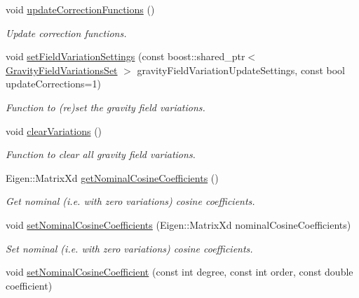 \begin{DoxyCompactItemize}
void \hyperlink{classtudat_1_1gravitation_1_1TimeDependentSphericalHarmonicsGravityField_a869a32a27923e1d7c693f609b957bd81}{update\+Correction\+Functions} ()
\begin{DoxyCompactList}\small\item\em Update correction functions. \end{DoxyCompactList}\item 
void \hyperlink{classtudat_1_1gravitation_1_1TimeDependentSphericalHarmonicsGravityField_a14b0facf17bdbc355512711ddb4cde57}{set\+Field\+Variation\+Settings} (const boost\+::shared\+\_\+ptr$<$ \hyperlink{classtudat_1_1gravitation_1_1GravityFieldVariationsSet}{Gravity\+Field\+Variations\+Set} $>$ gravity\+Field\+Variation\+Update\+Settings, const bool update\+Corrections=1)
\begin{DoxyCompactList}\small\item\em Function to (re)set the gravity field variations. \end{DoxyCompactList}\item 
void \hyperlink{classtudat_1_1gravitation_1_1TimeDependentSphericalHarmonicsGravityField_a26ff5e9340b27570340695b24b4501e6}{clear\+Variations} ()
\begin{DoxyCompactList}\small\item\em Function to clear all gravity field variations. \end{DoxyCompactList}\item 
Eigen\+::\+Matrix\+Xd \hyperlink{classtudat_1_1gravitation_1_1TimeDependentSphericalHarmonicsGravityField_a8ce8c65214e7e50a7221963f97d2ff53}{get\+Nominal\+Cosine\+Coefficients} ()
\begin{DoxyCompactList}\small\item\em Get nominal (i.\+e. with zero variations) cosine coefficients. \end{DoxyCompactList}\item 
void \hyperlink{classtudat_1_1gravitation_1_1TimeDependentSphericalHarmonicsGravityField_a8468b41ec8dfa77f53b6ee6124a89df4}{set\+Nominal\+Cosine\+Coefficients} (Eigen\+::\+Matrix\+Xd nominal\+Cosine\+Coefficients)
\begin{DoxyCompactList}\small\item\em Set nominal (i.\+e. with zero variations) cosine coefficients. \end{DoxyCompactList}\item 
void \hyperlink{classtudat_1_1gravitation_1_1TimeDependentSphericalHarmonicsGravityField_af7dc076f65d45c8a272c95232eb2231e}{set\+Nominal\+Cosine\+Coefficient} (const int degree, const int order, const double coefficient)

\end{DoxyCompactItemize}

